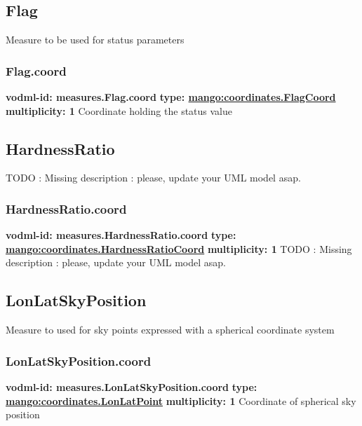   \subsection{Flag}
  \label{sect:measures.Flag}
    Measure to be used for status parameters

    \subsubsection{Flag.coord}
      \textbf{vodml-id: measures.Flag.coord} \newline
      \textbf{type: \hyperref[sect:coordinates.FlagCoord]{mango:coordinates.FlagCoord}} \newline
      \textbf{multiplicity: 1} \newline 
      Coordinate holding the status value

  \subsection{HardnessRatio}
  \label{sect:measures.HardnessRatio}
    TODO : Missing description : please, update your UML model asap.

    \subsubsection{HardnessRatio.coord}
      \textbf{vodml-id: measures.HardnessRatio.coord} \newline
      \textbf{type: \hyperref[sect:coordinates.HardnessRatioCoord]{mango:coordinates.HardnessRatioCoord}} \newline
      \textbf{multiplicity: 1} \newline 
      TODO : Missing description : please, update your UML model asap.

  \subsection{LonLatSkyPosition}
  \label{sect:measures.LonLatSkyPosition}
    Measure to used for sky points expressed with a spherical coordinate system

    \subsubsection{LonLatSkyPosition.coord}
      \textbf{vodml-id: measures.LonLatSkyPosition.coord} \newline
      \textbf{type: \hyperref[sect:coordinates.LonLatPoint]{mango:coordinates.LonLatPoint}} \newline
      \textbf{multiplicity: 1} \newline 
      Coordinate of spherical sky position

